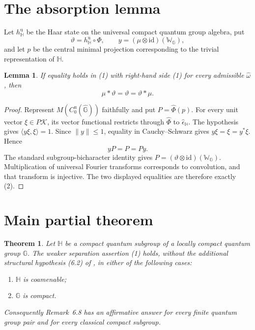 \documentclass[11pt]{article}
\newtheorem{theorem}{Theorem}
\newtheorem{lemma}{Lemma}
\newcommand{\Cu}{C_0^{\mathrm u}}
\begin{document}
\section*{The absorption lemma}

Let $h_{\mathbb H}^{\mathrm u}$ be the Haar state on the universal compact
quantum group algebra, put
\[
 \vartheta=h_{\mathbb H}^{\mathrm u}\circ\Phi,
 \qquad
 y=(\mu\otimes\mathrm{id})(\mathbb W_{\mathbb G}),
\]
and let $p$ be the central minimal projection corresponding to the trivial
representation of $\mathbb H$.

\begin{lemma}\label{lem:absorb}
If equality holds in (1) with right-hand side (1) for every admissible
$\widehat\omega$, then
\[
 \mu*\vartheta=\vartheta=\vartheta*\mu.                         \tag{2}
\]
\end{lemma}

\begin{proof}
Represent $M(\Cu(\widehat{\mathbb G}))$ faithfully and put
$P=\widehat\Phi(p)$.  For every unit vector $\xi\in P\mathcal K$, its
vector functional restricts through $\widehat\Phi$ to
$\widehat\epsilon_{\mathbb H}$.  The hypothesis gives
$\langle y\xi,\xi\rangle=1$.  Since $\|y\|\le1$, equality in
Cauchy--Schwarz gives $y\xi=\xi=y^*\xi$.  Hence
\[
 yP=P=Py.
\]
The standard subgroup-bicharacter identity gives
$P=(\vartheta\otimes\mathrm{id})(\mathbb W_{\mathbb G})$.
Multiplication of universal Fourier transforms corresponds to convolution,
and that transform is injective.  The two displayed equalities are therefore
exactly (2).
\end{proof}

\section*{Main partial theorem}

\begin{theorem}\label{thm:main}
Let $\mathbb H$ be a compact quantum subgroup of a locally compact quantum
group $\mathbb G$.  The weaker separation assertion (1) holds, without the
additional structural hypothesis (6.2) of \cite{RV}, in either of the
following cases:
\begin{enumerate}
\item $\mathbb H$ is coamenable;
\item $\mathbb G$ is compact.
\end{enumerate}
Consequently Remark~6.8 has an affirmative answer for every finite quantum
group pair and for every classical compact subgroup.
\end{theorem}
\end{document}
